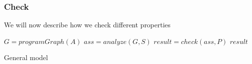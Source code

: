 \subsubsection{Check}\label{subsubsec:check}

We will now describe how we check different properties

\begin{algorithm}[htb!]
    \begin{codebox}
        \li $G = programGraph(A)$
        \li $ass = analyze(G,S)$
        \li $result = check(ass,P)$
        \li \Return $result$
    \end{codebox}
    \caption{General model}
    \label{alg:check}
\end{algorithm}